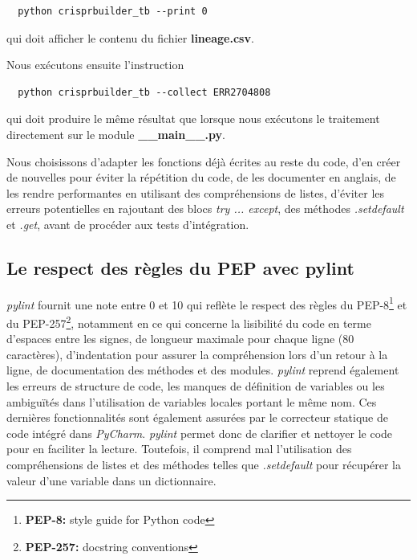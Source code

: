 \documentclass[twoside,a4paper,11pt,frenchb,openany]{report}
\begin{document}
\begin{verbatim}
  python crisprbuilder_tb --print 0
\end{verbatim}

qui doit afficher le contenu du fichier \textbf{lineage.csv}.

Nous exécutons ensuite l'instruction

\begin{verbatim}
  python crisprbuilder_tb --collect ERR2704808
\end{verbatim}

qui doit produire le même résultat que lorsque nous exécutons le traitement directement sur le module \textbf{\_\_main\_\_.py}.

Nous choisissons d'adapter les fonctions déjà écrites au reste du code, d'en créer de nouvelles pour éviter la répétition du code, de les documenter en anglais, de les rendre performantes en utilisant des compréhensions de listes, d'éviter les erreurs potentielles en rajoutant des blocs \textit{try ... except}, des méthodes \textit{.setdefault} et \textit{.get}, avant de procéder aux tests d'intégration.




\subsection{Le respect des règles du PEP avec pylint}

\textit{pylint} fournit une note entre 0 et 10 qui reflète le respect des règles du PEP-8\footnote{\textbf{PEP-8:} style guide for Python code} et du PEP-257\footnote{\textbf{PEP-257:} docstring conventions}, notamment en ce qui concerne la lisibilité du code en terme d'espaces entre les signes, de longueur maximale pour chaque ligne (80 caractères), d'indentation pour assurer la compréhension lors d'un retour à la ligne, de documentation des méthodes et des modules. \textit{pylint} reprend également les erreurs de structure de code, les manques de définition de variables ou les ambiguïtés dans l'utilisation de variables locales portant le même nom. Ces dernières fonctionnalités sont également assurées par le correcteur statique de code intégré dans \textit{PyCharm}. \textit{pylint} permet donc de clarifier et nettoyer le code pour en faciliter la lecture. Toutefois, il comprend mal l'utilisation des compréhensions de listes et des méthodes telles que \textit{.setdefault} pour récupérer la valeur d'une variable dans un dictionnaire. 
\end{document}
